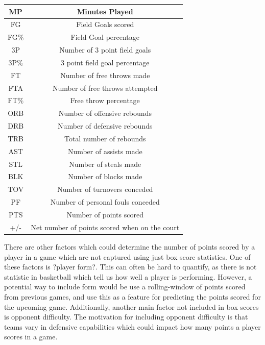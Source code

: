 \documentclass[a4paper,11pt,twoside]{article}
\begin{document}
\vspace{5mm}
\begin{center}
\begin{tabular}{ |c|c| } 
 \hline
MP & Minutes Played  \\ 
 \hline
FG & Field Goals scored \\ 
 \hline
FG\% & Field Goal percentage\\ 
 \hline
3P & Number of 3 point field goals\\
 \hline
 3P\% & 3 point field goal percentage\\
\hline
FT & Number of free throws made\\
\hline
FTA & Number of free throws attempted\\
\hline
FT\% & Free throw percentage\\
\hline
ORB & Number of offensive rebounds\\
\hline
DRB & Number of defensive rebounds\\
\hline
TRB & Total number of rebounds\\
\hline
AST & Number of assists made\\
\hline
STL & Number of steals made\\
\hline
BLK & Number of blocks made\\
\hline
TOV & Number of turnovers conceded\\
\hline
PF & Number of personal fouls conceded\\
\hline
PTS & Number of points scored\\
\hline
+/- & Net number of points scored when on the court\\
\hline
\end{tabular}
\end{center}
\vspace{5mm}


There are other factors which could determine the number of points scored by a player in a game which are not captured using just box score statistics. One of these factors is ?player form?. This can often be hard to quantify, as there is not statistic in basketball which tell us how well a player is performing.  However, a potential way to include form would be use a rolling-window of points scored from previous games, and use this as a feature for predicting the points scored for the upcoming game.  Additionally, another main factor not included in box scores is opponent difficulty. The motivation for including opponent difficulty is that teams vary in defensive capabilities which could impact how many points a player scores in a game.
\end{document}
